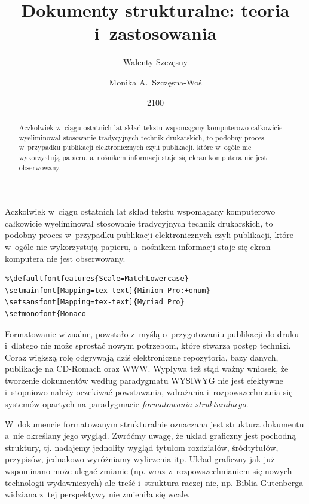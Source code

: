 \documentclass[brudnopis,xodstep]{xmgr}
\author   {Walenty Szczęsny}
\author   {Monika A.~Szczęsna-Woś}
\title    {Dokumenty strukturalne: teoria i~zastosowania}
\date     {2100}
\begin{document}
\begin{abstract}
  Aczkolwiek w~ciągu ostatnich lat skład tekstu wspomagany komputerowo
  całkowicie wyeliminował stosowanie tradycyjnych technik drukarskich,
  to podobny proces w~przypadku publikacji elektronicznych czyli
  publikacji, które w~ogóle nie wykorzystują papieru, a~nośnikem
  informacji staje się ekran komputera nie jest obserwowany.
\end{abstract}

\maketitle
%
\introduction

Aczkolwiek w~ciągu ostatnich lat skład tekstu wspomagany
komputerowo całkowicie wyeliminował stosowanie tradycyjnych technik
drukarskich, to podobny proces w~przypadku publikacji elektronicznych
czyli publikacji, które w~ogóle nie wykorzystują papieru, a~nośnikem
informacji staje się ekran komputera nie jest obserwowany.

\begin{verbatim}
%\defaultfontfeatures{Scale=MatchLowercase}
\setmainfont[Mapping=tex-text]{Minion Pro:+onum}
\setsansfont[Mapping=tex-text]{Myriad Pro}
\setmonofont{Monaco
\end{verbatim}

Formatowanie wizualne, powstało z~myślą o~przygotowaniu publikacji do
druku i~dlatego nie może sprostać nowym potrzebom, które stwarza
postęp techniki. Coraz większą rolę odgrywają dziś elektroniczne
repozytoria, bazy danych, publikacje na CD-Romach oraz WWW.  Wypływa
też stąd ważny wniosek, że tworzenie dokumentów według paradygmatu
WYSIWYG nie jest efektywne i~stopniowo należy oczekiwać powstawania,
wdrażania i~rozpowszechniania się systemów opartych na paradygmacie
\emph{formatowania strukturalnego}.

W~dokumencie formatowanym strukturalnie oznaczana jest struktura
dokumentu a~nie określany jego wygląd. Zwróćmy uwagę, że układ
graficzny jest pochodną struktury, tj. nadajemy jednolity wygląd
tytułom rozdziałów, śródtytułów, przypisów, jednakowo wyróżniamy
wyliczenia itp.  Układ graficzny jak już wspominano może ulegać zmianie
(np. wraz z~rozpowszechnianiem się nowych technologii wydawniczych)
ale treść i~struktura raczej nie, np. Biblia Gutenberga widziana z~tej
perspektywy nie zmieniła się wcale.

\end{document}
